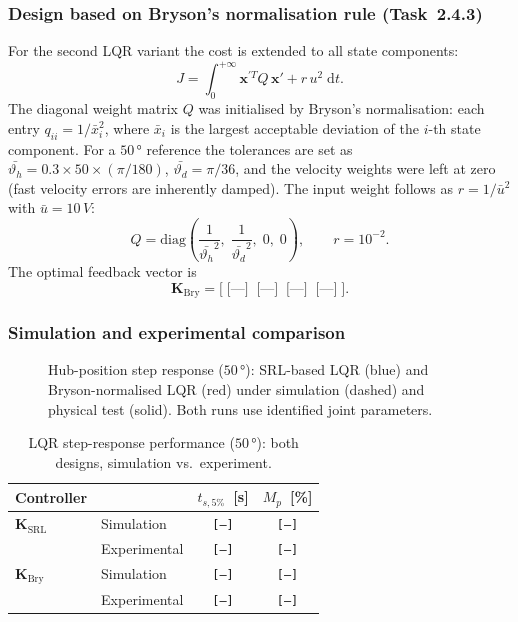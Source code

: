 \documentclass[11pt]{article}
\DeclareRobustCommand{\vect}[1]{ \boldsymbol{#1} }
\newcommand{\thh}{\vartheta_h}
\newcommand{\thd}{\vartheta_d}
\begin{document}
\subsubsection*{Design based on Bryson's normalisation rule (Task~2.4.3)}

For the second LQR variant the cost is extended to all state components:
\begin{equation}
    J = \int_0^{+\infty} \vect{x}^{\prime T} Q\,\vect{x}' + r\,u^2\;\mathrm{d}t.
    \label{eq:cost_bryson}
\end{equation}
The diagonal weight matrix $Q$ was initialised by Bryson's normalisation: each entry
$q_{ii} = 1/\bar{x}_i^2$, where $\bar{x}_i$ is the largest acceptable deviation of the
$i$-th state component.  For a $50\,\si{\degree}$ reference the tolerances are set as
$\bar{\thh} = 0.3 \times 50 \times (\pi/180)$, $\bar{\thd} = \pi/36$, and the
velocity weights were left at zero (fast velocity errors are inherently damped).
The input weight follows as $r = 1/\bar{u}^2$ with $\bar{u} = 10\,\si{V}$:
\begin{equation}
    Q = \mathrm{diag}\!\left(\frac{1}{\bar{\thh}^2},\;\frac{1}{\bar{\thd}^2},\;0,\;0\right),
    \qquad r = 10^{-2}.
    \label{eq:bryson_weights}
\end{equation}
The optimal feedback vector is
\begin{equation}
    \vect{K}_\mathrm{Bry} = \bigl[\;\texttt{[---]}\;\;\texttt{[---]}\;\;\texttt{[---]}\;\;\texttt{[---]}\;\bigr].
\end{equation}

\subsubsection*{Simulation and experimental comparison}

\begin{figure}[H]
    \centering
    \caption{Hub-position step response ($50\,\si{\degree}$): SRL-based LQR (blue) and
             Bryson-normalised LQR (red) under simulation (dashed) and physical test
             (solid).  Both runs use identified joint parameters.}
    \label{fig:lqr_compare}
\end{figure}

\begin{table}[H]
\centering
\caption{LQR step-response performance ($50\,\si{\degree}$): both designs, simulation
         vs.\ experiment.}
\label{tab:lqr_perf}
\begin{tabular}{llcc}
\toprule
Controller & & $t_{s,5\%}$~[s] & $M_p$~[\%] \\
\midrule
$\vect{K}_\mathrm{SRL}$  & Simulation   & \texttt{[---]} & \texttt{[---]} \\
                          & Experimental & \texttt{[---]} & \texttt{[---]} \\
\midrule
$\vect{K}_\mathrm{Bry}$  & Simulation   & \texttt{[---]} & \texttt{[---]} \\
                          & Experimental & \texttt{[---]} & \texttt{[---]} \\
\bottomrule
\end{tabular}
\end{table}
\end{document}
